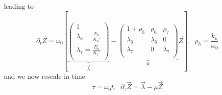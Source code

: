 \documentclass[aps,onecolumn,11pt]{revtex4}
\begin{document}
leading to
\begin{equation}
	\partial_t \vec{Z} = \omega_0
	\left\lbrack
	\underbrace{
	\begin{pmatrix}
	1\\
	\lambda_6 = \frac{E_0}{K_6'}\\
	\lambda_7 = \frac{E_0}{K_7'}\\
	\end{pmatrix}}_{\vec{\lambda}}
	-
	\underbrace{
	\begin{pmatrix}
	1+\rho_h & \rho_6 & \rho_7\\
	\lambda_6 & \lambda_6 & 0 \\
	\lambda_7 & 0      & \lambda_7\\
	\end{pmatrix}
	}_{\mu}
	\vec{Z}
	\right\rbrack, \;\; \rho_h = \frac{k_h}{\omega_0}
\end{equation}
and we now rescale in time
\begin{equation}
\tau = \omega_0 t, \;\; \partial_\tau \vec{Z} = \vec{\lambda} - \mu \vec{Z}
\end{equation}
\end{document}
